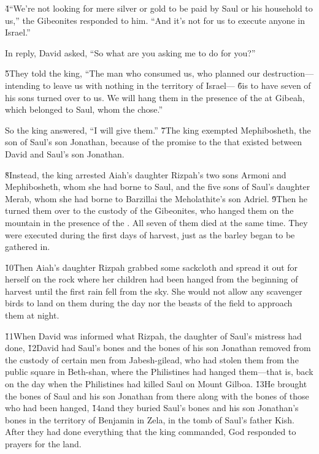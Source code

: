 \v{4}``We're not looking for mere silver or gold to be paid by Saul or his household to us,'' the Gibeonites responded to him. ``And it's not for us to execute anyone in Israel.''

In reply, David asked, ``So what are you asking me to do for you?''

\v{5}They told the king, ``The man who consumed us, who planned our destruction---intending to leave us with nothing in the territory of Israel--- \v{6}is to have seven of his sons turned over to us. We will hang them in the presence of the  at Gibeah, which belonged to Saul, whom the  chose.''

So the king answered, ``I will give them.'' \v{7}The king exempted Mephibosheth, the son of Saul's son Jonathan, because of the promise to the  that existed between David and Saul's son Jonathan.

\v{8}Instead, the king arrested Aiah's daughter Rizpah's two sons Armoni and Mephibosheth, whom she had borne to Saul, and the five sons of Saul's daughter Merab, whom she had borne to Barzillai the Meholathite's son Adriel. \v{9}Then he turned them over to the custody of the Gibeonites, who hanged them on the mountain in the presence of the . All seven of them died at the same time. They were executed during the first days of harvest, just as the barley began to be gathered in.

\v{10}Then Aiah's daughter Rizpah grabbed some sackcloth and spread it out for herself on the rock where her children had been hanged from the beginning of harvest until the first rain fell from the sky. She would not allow any scavenger birds to land on them during the day nor the beasts of the field to approach them at night.

\v{11}When David was informed what Rizpah, the daughter of Saul's mistress had done, \v{12}David had Saul's bones and the bones of his son Jonathan removed from the custody of certain men from Jabesh-gilead, who had stolen them from the public square in Beth-shan, where the Philistines had hanged them---that is, back on the day when the Philistines had killed Saul on Mount Gilboa. \v{13}He brought the bones of Saul and his son Jonathan from there along with the bones of those who had been hanged, \v{14}and they buried Saul's bones and his son Jonathan's bones in the territory of Benjamin in Zela, in the tomb of Saul's father Kish. After they had done everything that the king commanded, God responded to prayers for the land.

